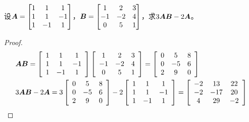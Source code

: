\begin{problem}
设\(\boldsymbol{A}=\begin{bmatrix}
    1 & 1  & 1  \\
    1 & 1  & -1 \\
    1 & -1 & 1
\end{bmatrix}\)，\(\boldsymbol{B}=\begin{bmatrix}
    1  & 2  & 3 \\
    -1 & -2 & 4 \\
    0  & 5  & 1
\end{bmatrix}\)，求\(3\boldsymbol{A}\boldsymbol{B}-2\boldsymbol{A}\)。
\end{problem}
\begin{proof}
    \begin{align*}
         & \boldsymbol{A}\boldsymbol{B}           =
        \left[\begin{array}{ccc}
                      1 & 1  & 1  \\
                      1 & 1  & -1 \\
                      1 & -1 & 1
                  \end{array}\right]
        \left[\begin{array}{ccc}
                      1  & 2  & 3 \\
                      -1 & -2 & 4 \\
                      0  & 5  & 1
                  \end{array}\right]=
        \left[\begin{array}{ccc}
                      0 & 5  & 8 \\
                      0 & -5 & 6 \\
                      2 & 9  & 0
                  \end{array}\right]  \\
         & 3\boldsymbol{A}\boldsymbol{B}-2 \boldsymbol{A}  =
        3\left[\begin{array}{ccc}
                       0 & 5  & 8 \\
                       0 & -5 & 6 \\
                       2 & 9  & 0
                   \end{array}\right]
        -2\left[\begin{array}{ccc}
                        1 & 1  & 1  \\
                        1 & 1  & -1 \\
                        1 & -1 & 1
                    \end{array}\right]
        =\left[\begin{array}{ccc}
                       -2 & 13  & 22 \\
                       -2 & -17 & 20 \\
                       4  & 29  & -2
                   \end{array}\right]
    \end{align*}
\end{proof}

